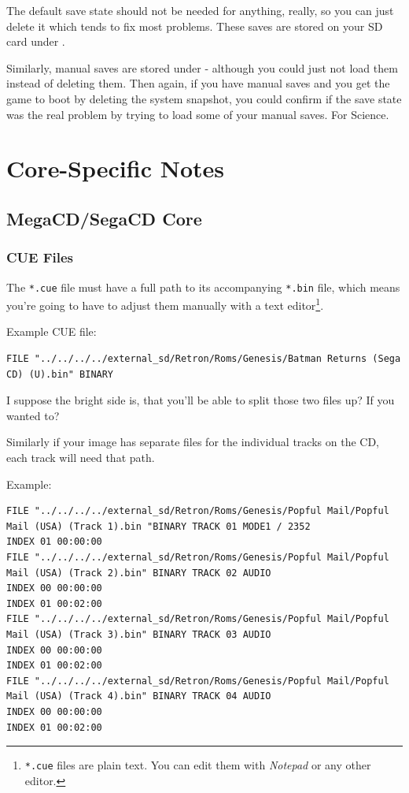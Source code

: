 \documentclass[a4paper]{article}
\begin{document}
The default save state should not be needed for anything, really, so you can just delete it which tends to fix most problems. These saves are stored on your SD card under .

Similarly, manual saves are stored under  - although you could just not load them instead of deleting them. Then again, if you have manual saves and you get the game to boot by deleting the system snapshot, you could confirm if the save state was the real problem by trying to load some of your manual saves. For Science.

\glsaddallunused
\printglossary[title=File Formats, toctitle=Supported ROM File Formats, type=file-type, nonumberlist]

\section{Core-Specific Notes}

\subsection{MegaCD/SegaCD Core}

\subsubsection{CUE Files}

The \texttt{*.cue} file must have a full path to its accompanying \texttt{*.bin} file, which means you're going to have to adjust them manually with a text editor\footnote{\texttt{*.cue} files are plain text. You can edit them with \emph{Notepad} or any other editor.}.

Example CUE file:

\begin{lstlisting}[breaklines]
FILE "../../../../external_sd/Retron/Roms/Genesis/Batman Returns (Sega CD) (U).bin" BINARY
\end{lstlisting}

I suppose the bright side is, that you'll be able to split those two files up? If you wanted to?

Similarly if your image has separate files for the individual tracks on the CD, each track will need that path.

Example:

\begin{lstlisting}[breaklines=true]
FILE "../../../../external_sd/Retron/Roms/Genesis/Popful Mail/Popful Mail (USA) (Track 1).bin "BINARY TRACK 01 MODE1 / 2352
INDEX 01 00:00:00
FILE "../../../../external_sd/Retron/Roms/Genesis/Popful Mail/Popful Mail (USA) (Track 2).bin" BINARY TRACK 02 AUDIO
INDEX 00 00:00:00
INDEX 01 00:02:00
FILE "../../../../external_sd/Retron/Roms/Genesis/Popful Mail/Popful Mail (USA) (Track 3).bin" BINARY TRACK 03 AUDIO
INDEX 00 00:00:00
INDEX 01 00:02:00
FILE "../../../../external_sd/Retron/Roms/Genesis/Popful Mail/Popful Mail (USA) (Track 4).bin" BINARY TRACK 04 AUDIO
INDEX 00 00:00:00
INDEX 01 00:02:00
\end{lstlisting}
\end{document}
